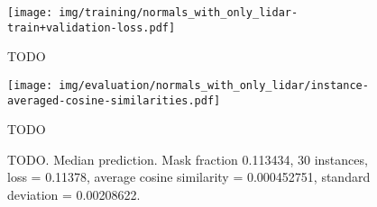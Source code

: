 \begin{figure}[H]
  \texttt{[image: img/training/normals\_with\_only\_lidar-train+validation-loss.pdf]}
  \caption{TODO}
\end{figure}

\begin{figure}[H]
  \texttt{[image: img/evaluation/normals\_with\_only\_lidar/instance-averaged-cosine-similarities.pdf]}
  \caption{TODO}
\end{figure}

\begin{figure}[H]
  \caption{%
    TODO.
    Median prediction.
    Mask fraction \num{0.113434}, 30 instances, loss = \num{0.11378}, average cosine similarity = \num{0.000452751}, standard deviation = \num{0.00208622}.
  }
\end{figure}
